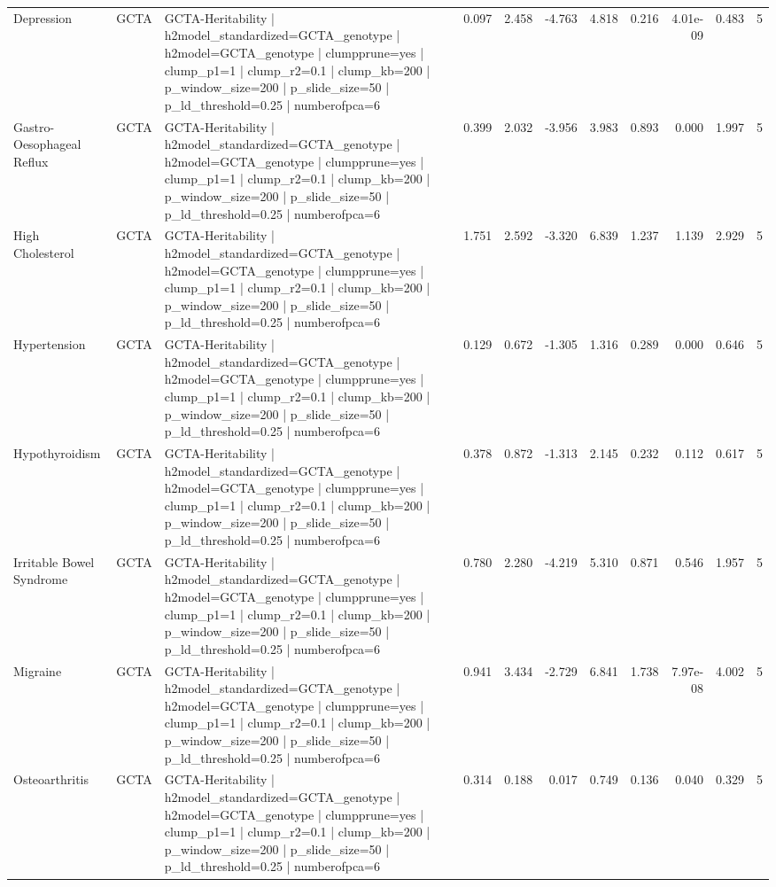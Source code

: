 \begin{landscape}
\begin{longtable}{p{2.4cm}p{1.8cm}p{6.0cm}rrrrrrrr}
Depression & GCTA & GCTA-Heritability | h2model\_standardized=GCTA\_genotype | h2model=GCTA\_genotype | clumpprune=yes | clump\_p1=1 | clump\_r2=0.1 | clump\_kb=200 | p\_window\_size=200 | p\_slide\_size=50 | p\_ld\_threshold=0.25 | numberofpca=6 & 0.097 & 2.458 & -4.763 & 4.818 & 0.216 & 4.01e-09 & 0.483 & 5 \\
Gastro-Oesophageal Reflux & GCTA & GCTA-Heritability | h2model\_standardized=GCTA\_genotype | h2model=GCTA\_genotype | clumpprune=yes | clump\_p1=1 | clump\_r2=0.1 | clump\_kb=200 | p\_window\_size=200 | p\_slide\_size=50 | p\_ld\_threshold=0.25 | numberofpca=6 & 0.399 & 2.032 & -3.956 & 3.983 & 0.893 & 0.000 & 1.997 & 5 \\
High Cholesterol & GCTA & GCTA-Heritability | h2model\_standardized=GCTA\_genotype | h2model=GCTA\_genotype | clumpprune=yes | clump\_p1=1 | clump\_r2=0.1 | clump\_kb=200 | p\_window\_size=200 | p\_slide\_size=50 | p\_ld\_threshold=0.25 | numberofpca=6 & 1.751 & 2.592 & -3.320 & 6.839 & 1.237 & 1.139 & 2.929 & 5 \\
Hypertension & GCTA & GCTA-Heritability | h2model\_standardized=GCTA\_genotype | h2model=GCTA\_genotype | clumpprune=yes | clump\_p1=1 | clump\_r2=0.1 | clump\_kb=200 | p\_window\_size=200 | p\_slide\_size=50 | p\_ld\_threshold=0.25 | numberofpca=6 & 0.129 & 0.672 & -1.305 & 1.316 & 0.289 & 0.000 & 0.646 & 5 \\
Hypothyroidism & GCTA & GCTA-Heritability | h2model\_standardized=GCTA\_genotype | h2model=GCTA\_genotype | clumpprune=yes | clump\_p1=1 | clump\_r2=0.1 | clump\_kb=200 | p\_window\_size=200 | p\_slide\_size=50 | p\_ld\_threshold=0.25 | numberofpca=6 & 0.378 & 0.872 & -1.313 & 2.145 & 0.232 & 0.112 & 0.617 & 5 \\
Irritable Bowel Syndrome & GCTA & GCTA-Heritability | h2model\_standardized=GCTA\_genotype | h2model=GCTA\_genotype | clumpprune=yes | clump\_p1=1 | clump\_r2=0.1 | clump\_kb=200 | p\_window\_size=200 | p\_slide\_size=50 | p\_ld\_threshold=0.25 | numberofpca=6 & 0.780 & 2.280 & -4.219 & 5.310 & 0.871 & 0.546 & 1.957 & 5 \\
Migraine & GCTA & GCTA-Heritability | h2model\_standardized=GCTA\_genotype | h2model=GCTA\_genotype | clumpprune=yes | clump\_p1=1 | clump\_r2=0.1 | clump\_kb=200 | p\_window\_size=200 | p\_slide\_size=50 | p\_ld\_threshold=0.25 | numberofpca=6 & 0.941 & 3.434 & -2.729 & 6.841 & 1.738 & 7.97e-08 & 4.002 & 5 \\
Osteoarthritis & GCTA & GCTA-Heritability | h2model\_standardized=GCTA\_genotype | h2model=GCTA\_genotype | clumpprune=yes | clump\_p1=1 | clump\_r2=0.1 | clump\_kb=200 | p\_window\_size=200 | p\_slide\_size=50 | p\_ld\_threshold=0.25 | numberofpca=6 & 0.314 & 0.188 & 0.017 & 0.749 & 0.136 & 0.040 & 0.329 & 5 \\

\end{longtable}
\end{landscape}
